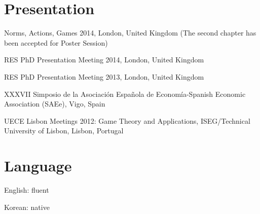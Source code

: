 \documentclass[letterpaper,11pt]{article}
\renewenvironment{itemize}{
\begin{list}{}{
\setlength{\leftmargin}{1.5em}
}
}{
\end{list}
}
\begin{document}
\section*{Presentation}
\begin{itemize}
\item Norms, Actions, Games 2014, London, United Kingdom (The second chapter has been accepted for Poster Session)
\item RES PhD Presentation Meeting 2014, London, United Kingdom
\item RES PhD Presentation Meeting 2013, London, United Kingdom
\item XXXVII Simposio de la Asociaci\'on Espa\~nola de Econom\'ia-Spanish Economic Association (SAEe), Vigo, Spain
\item UECE Lisbon Meetings 2012: Game Theory and Applications, ISEG/Technical University of Lisbon, Lisbon, Portugal
\end{itemize}


\section*{Language}
\begin{itemize}
\item English: fluent
\item Korean: native
\end{itemize}

\end{document}
